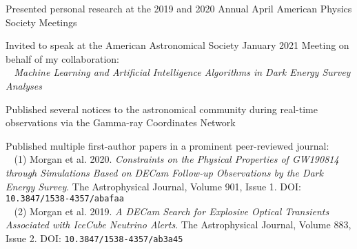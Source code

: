 
\begin{cventries}
\vspace{-0.8cm}
  \cventry
    {} %
    {} %
    {} %
    {} %
    {
    \begin{cvitems}
    \item{Presented personal research at the 2019 and 2020 Annual April American Physics Society Meetings}
    \item{Invited to speak at the American Astronomical Society January 2021 Meeting on behalf of my collaboration: \\ \textcolor{white}{..} \textit{Machine Learning and Artificial Intelligence Algorithms in Dark Energy Survey Analyses}}
    \item{Published several notices to the astronomical community during real-time observations via the Gamma-ray Coordinates Network}
    \item{Published multiple first-author papers in a prominent peer-reviewed journal:  \\ \textcolor{white}{..} (1) Morgan et al. 2020. \textit{Constraints on the Physical Properties of GW190814 through Simulations Based on DECam Follow-up Observations by the Dark Energy Survey}. The Astrophysical Journal, Volume 901, Issue 1. DOI: \texttt{10.3847/1538-4357/abafaa}  \\ \textcolor{white}{..} (2) Morgan et al. 2019. \textit{A DECam Search for Explosive Optical Transients Associated with IceCube Neutrino Alerts}. The Astrophysical Journal,  Volume 883, Issue 2. DOI: \texttt{10.3847/1538-4357/ab3a45}}
    \end{cvitems}
    }

\end{cventries}

